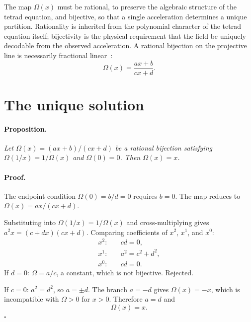 \documentclass[twocolumn]{iopjournal}
\begin{document}
The map $\Omega(x)$ must be rational, to preserve the
algebraic structure of the tetrad equation, and bijective,
so that a single acceleration determines a unique partition.
Rationality is inherited from the polynomial character of the
tetrad equation itself; bijectivity is the physical requirement
that the field be uniquely decodable from the observed
acceleration.
A rational bijection on the projective line is necessarily
fractional linear~\cite{Hartshorne1977}:
\begin{equation}
  \Omega(x) = \frac{ax + b}{cx + d}.
  \label{eq:mobius}
\end{equation}


\section*{The unique solution}

\paragraph{Proposition.} \textit{Let
$\Omega(x) = (ax+b)/(cx+d)$ be a rational bijection
satisfying $\Omega(1/x) = 1/\Omega(x)$ and $\Omega(0) = 0$.
Then $\Omega(x) = x$.}

\paragraph{Proof.}
The endpoint condition $\Omega(0) = b/d = 0$ requires $b = 0$.
The map reduces to $\Omega(x) = ax/(cx + d)$.

Substituting into $\Omega(1/x) = 1/\Omega(x)$ and
cross-multiplying gives $a^2 x = (c + dx)(cx + d)$.
Comparing coefficients of $x^2$, $x^1$, and $x^0$:
\begin{align}
  x^2: \quad & cd = 0, \label{eq:x2} \\
  x^1: \quad & a^2 = c^2 + d^2, \label{eq:x1} \\
  x^0: \quad & cd = 0. \label{eq:x0}
\end{align}
If $d = 0$: $\Omega = a/c$, a constant, which is not
bijective. Rejected.

If $c = 0$: $a^2 = d^2$, so $a = \pm d$. The branch
$a = -d$ gives $\Omega(x) = -x$, which is incompatible
with $\Omega > 0$ for $x > 0$. Therefore $a = d$ and
\begin{equation}
  \Omega(x) = x.
  \label{eq:omega_result}
\end{equation}
\hfill$\square$
\end{document}
